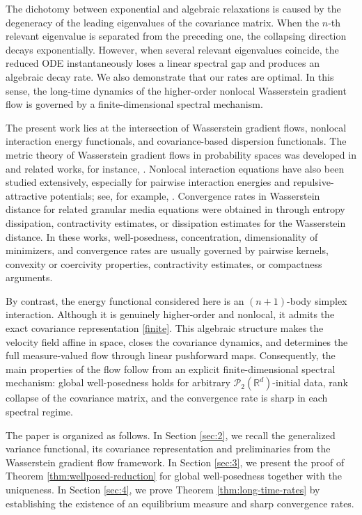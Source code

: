 \documentclass[11pt,reqno]{amsart}
\numberwithin{figure}{section}
\begin{document}
The dichotomy between exponential and algebraic relaxations is caused by the degeneracy of the leading eigenvalues of the covariance matrix. When the $n$-th relevant eigenvalue is separated from the preceding one, the collapsing direction decays exponentially. However, when several relevant eigenvalues coincide, the reduced ODE instantaneously loses a linear spectral gap and produces an algebraic decay rate. We also demonstrate that our rates are optimal. In this sense, the long-time dynamics of the higher-order nonlocal Wasserstein
gradient flow is governed by a finite-dimensional spectral mechanism.


The present work lies at the intersection of Wasserstein gradient flows, nonlocal interaction energy functionals, and covariance-based dispersion functionals. The metric theory of Wasserstein gradient flows in probability spaces was developed in \cite{AGS2005,JKO,otto2001geometry} and related works, for instance, \cite{ambrosio2008hamiltonian,daneri2008eulerian,lisini2007characterization}. Nonlocal interaction equations have also been studied extensively, especially for pairwise interaction energies and repulsive-attractive potentials; see, for example, \cite{balague2013dimensionality,carrillo2011global,craig2017nonconvex,craig2016convergence}. Convergence rates in Wasserstein distance for related granular media equations were obtained in \cite{bolley2012uniform,carrillo2003kinetic,carrillo2006contractions} through entropy dissipation, contractivity estimates, or dissipation estimates for the Wasserstein distance. In these works, well-posedness, concentration, dimensionality of minimizers, and convergence rates are usually governed by pairwise kernels, convexity or coercivity properties, contractivity estimates, or compactness arguments.


By contrast, the energy functional considered here is an $(n+1)$-body simplex interaction. Although it is genuinely higher-order and nonlocal, it admits the exact covariance representation \eqref{finite}. This algebraic structure makes the velocity field affine in space, closes the covariance dynamics, and determines the full measure-valued flow through linear pushforward maps. Consequently, the main properties of the flow follow from an explicit finite-dimensional spectral mechanism: global well-posedness holds for arbitrary $\mathcal P_2(\mathbb R^d)$-initial data, rank collapse of the covariance matrix, and the convergence rate is sharp in each spectral regime.

 
The paper is organized as follows. In Section \ref{sec:2}, we recall the generalized variance functional, its covariance representation and preliminaries from the Wasserstein gradient flow framework. In Section \ref{sec:3}, we present the proof of Theorem \ref{thm:wellposed-reduction} for   global well-posedness together with the uniqueness. In Section \ref{sec:4}, we prove Theorem \ref{thm:long-time-rates} by establishing  the existence of an equilibrium measure and sharp convergence rates.
\end{document}
